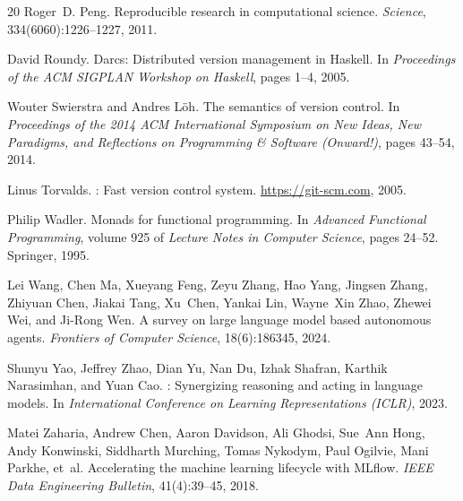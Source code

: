 \documentclass{article}
\begin{document}
\begin{thebibliography}{20}
Roger~D. Peng.
\newblock Reproducible research in computational science.
\newblock \emph{Science}, 334(6060):1226--1227, 2011.

David Roundy.
\newblock Darcs: Distributed version management in {Haskell}.
\newblock In \emph{Proceedings of the ACM SIGPLAN Workshop on Haskell}, pages
  1--4, 2005.

Wouter Swierstra and Andres L\"{o}h.
\newblock The semantics of version control.
\newblock In \emph{Proceedings of the 2014 ACM International Symposium on New
  Ideas, New Paradigms, and Reflections on Programming \& Software (Onward!)},
  pages 43--54, 2014.

Linus Torvalds.
: Fast version control system.
\newblock \url{https://git-scm.com}, 2005.

Philip Wadler.
\newblock Monads for functional programming.
\newblock In \emph{Advanced Functional Programming}, volume 925 of
  \emph{Lecture Notes in Computer Science}, pages 24--52. Springer, 1995.

Lei Wang, Chen Ma, Xueyang Feng, Zeyu Zhang, Hao Yang, Jingsen Zhang, Zhiyuan
  Chen, Jiakai Tang, Xu~Chen, Yankai Lin, Wayne~Xin Zhao, Zhewei Wei, and
  Ji-Rong Wen.
\newblock A survey on large language model based autonomous agents.
\newblock \emph{Frontiers of Computer Science}, 18(6):186345, 2024.

Shunyu Yao, Jeffrey Zhao, Dian Yu, Nan Du, Izhak Shafran, Karthik Narasimhan,
  and Yuan Cao.
: Synergizing reasoning and acting in language models.
\newblock In \emph{International Conference on Learning Representations
  (ICLR)}, 2023.

Matei Zaharia, Andrew Chen, Aaron Davidson, Ali Ghodsi, Sue~Ann Hong, Andy
  Konwinski, Siddharth Murching, Tomas Nykodym, Paul Ogilvie, Mani Parkhe,
  et~al.
\newblock Accelerating the machine learning lifecycle with {MLflow}.
\newblock \emph{IEEE Data Engineering Bulletin}, 41(4):39--45, 2018.

\end{thebibliography}
\end{document}
